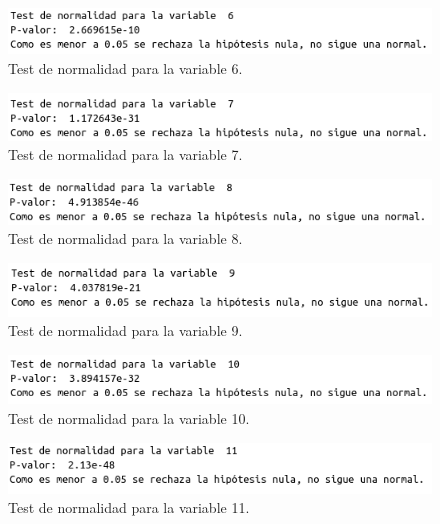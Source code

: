 \documentclass[12pt,a4paper]{article}
\begin{document}
\begin{figure}[H]
	\centering
	\includegraphics[scale=0.6]{./Imagenes/EDA/Clasificacion/test_normalidad6.png}
	\caption{Test de normalidad para la variable 6.}
\end{figure}

\begin{figure}[H]
	\centering
	\includegraphics[scale=0.6]{./Imagenes/EDA/Clasificacion/test_normalidad7.png}
	\caption{Test de normalidad para la variable 7.}
\end{figure}

\begin{figure}[H]
	\centering
	\includegraphics[scale=0.6]{./Imagenes/EDA/Clasificacion/test_normalidad8.png}
	\caption{Test de normalidad para la variable 8.}
\end{figure}

\begin{figure}[H]
	\centering
	\includegraphics[scale=0.6]{./Imagenes/EDA/Clasificacion/test_normalidad9.png}
	\caption{Test de normalidad para la variable 9.}
\end{figure}

\begin{figure}[H]
	\centering
	\includegraphics[scale=0.6]{./Imagenes/EDA/Clasificacion/test_normalidad10.png}
	\caption{Test de normalidad para la variable 10.}
\end{figure}

\begin{figure}[H]
	\centering
	\includegraphics[scale=0.6]{./Imagenes/EDA/Clasificacion/test_normalidad11.png}
	\caption{Test de normalidad para la variable 11.}
\end{figure}
\end{document}
